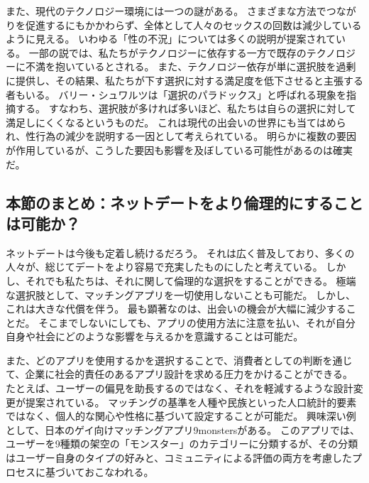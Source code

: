\documentclass[paper=a4,book,openany]{jlreq}
\begin{document}
また、現代のテクノロジー環境には一つの謎がある。
さまざまな方法でつながりを促進するにもかかわらず、全体として人々のセックスの回数は減少しているように見える。
いわゆる「性の不況」については多くの説明が提案されている\citep{julian18:_why_are_young_peopl_havin}。
一部の説では、私たちがテクノロジーに依存する一方で既存のテクノロジーに不満を抱いているとされる。
また、テクノロジー依存が単に選択肢を過剰に提供し、その結果、私たちが下す選択に対する満足度を低下させると主張する者もいる。
バリー・シュワルツは「選択のパラドックス」と呼ばれる現象を指摘する。
すなわち、選択肢が多ければ多いほど、私たちは自らの選択に対して満足しにくくなるというものだ。
これは現代の出会いの世界にも当てはめられ、性行為の減少を説明する一因として考えられている\citep{svoboda16:_probl_moder_roman_is_too_much_choic}。
明らかに複数の要因が作用しているが、こうした要因も影響を及ぼしている可能性があるのは確実だ。

\subsection{本節のまとめ：ネットデートをより倫理的にすることは可能か？}

ネットデートは今後も定着し続けるだろう。
それは広く普及しており、多くの人々が、総じてデートをより容易で充実したものにしたと考えている。
しかし、それでも私たちは、それに関して倫理的な選択をすることができる。
極端な選択肢として、マッチングアプリを一切使用しないことも可能だ。
しかし、これは大きな代償を伴う。
最も顕著なのは、出会いの機会が大幅に減少することだ。
そこまでしないにしても、アプリの使用方法に注意を払い、それが自分自身や社会にどのような影響を与えるかを意識することは可能だ。

また、どのアプリを使用するかを選択することで、消費者としての判断を通じて、企業に社会的責任のあるアプリ設計を求める圧力をかけることができる。
たとえば、ユーザーの偏見を助長するのではなく、それを軽減するような設計変更が提案されている。
マッチングの基準を人種や民族といった人口統計的要素ではなく、個人的な関心や性格に基づいて設定することが可能だ。
興味深い例として、日本のゲイ向けマッチングアプリ{9monsters}がある。
このアプリでは、ユーザーを9種類の架空の「モンスター」のカテゴリーに分類するが、その分類はユーザー自身のタイプの好みと、コミュニティによる評価の両方を考慮したプロセスに基づいておこなわれる\citep{miksche17:_meet_gay_app,hutson18:_debias_desir}。
\end{document}
